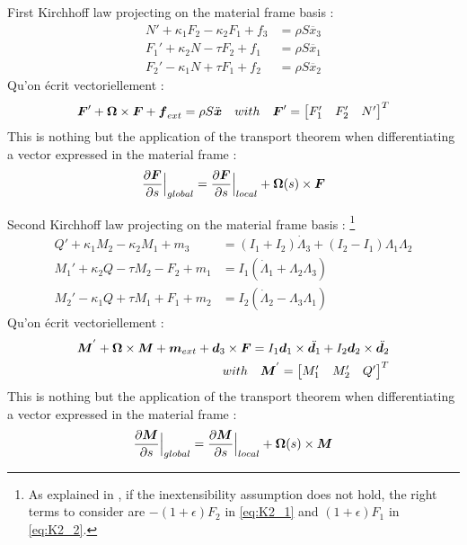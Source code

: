 First Kirchhoff law projecting on the material frame basis :
\begin{subequations}
	\begin{align}
		N' + \kappa_1 F_2 - \kappa_2 F_1 + f_3 &= \rho S \ddot{x_3}
		\label{eq:K1_3}\\
		F_1' + \kappa_2 N - \tau F_2 + f_1 &= \rho S \ddot{x_1}
		\label{eq:K1_1}\\
		F_2' - \kappa_1 N + \tau F_1 + f_2 &= \rho S \ddot{x_2}
		\label{eq:K1_2}
	\end{align}
\end{subequations}
Qu'on écrit vectoriellement : 
\begin{equation}
	\boldsymbol{F}' + \boldsymbol{\Omega} \times \boldsymbol{F} + \boldsymbol{f}_{ext} = \rho S \ddot{\boldsymbol{x}} 
	\quad with \quad
	\boldsymbol{F}' = 
	\begin{bmatrix}F'_1 & F'_2 & N'\end{bmatrix}^T
\end{equation}
This is nothing but the application of the transport theorem when differentiating a vector expressed in the material frame : 
\begin{equation}
	\frac{\partial \boldsymbol{F}}{\partial s}\Bigr|_{global} = \frac{\partial \boldsymbol{F}}{\partial s}\Bigr|_{local} + \boldsymbol{\Omega}(s) \times \boldsymbol{F}
\end{equation}

Second Kirchhoff law projecting on the material frame basis : \footnote{As explained in \cite[p. 18]{Dill1992}, if the inextensibility assumption does not hold, the right terms to consider are $-(1+\epsilon)F_2$ in \cref{eq:K2_1} and $(1+\epsilon)F_1$ in \cref{eq:K2_2}.}
\begin{subequations}
	\begin{align}
		Q' + \kappa_1 M_2 - \kappa_2 M_1 + m_3 &= (I_1 + I_2)\dot{\Lambda}_3 + (I_2 - I_1)\Lambda_1\Lambda_2
		\label{eq:K2_2}\\
		M_1' + \kappa_2 Q - \tau M_2 - F_2 + m_1 &= I_1 (\dot{\Lambda}_1 + \Lambda_2 \Lambda_3)
		\label{eq:K2_1}\\
		M_2' - \kappa_1 Q + \tau M_1 + F_1 + m_2 &= I_2 (\dot{\Lambda}_2 - \Lambda_3 \Lambda_1)
		\label{eq:K2_2}
	\end{align}
\end{subequations}
Qu'on écrit vectoriellement : 
\begin{align}
	\boldsymbol{M}^{'} + \boldsymbol{\Omega} \times \boldsymbol{M} + \boldsymbol{m}_{ext} + \boldsymbol{d}_3 \times \boldsymbol{F} = I_1 \boldsymbol{d}_1 \times \ddot{\boldsymbol{d}_1} + I_2 \boldsymbol{d}_2 \times \ddot{\boldsymbol{d}_2} \\
	\quad with \quad
	\boldsymbol{M}^{'} = 
	\begin{bmatrix}M'_1 & M'_2 & Q'\end{bmatrix}^T
\end{align}
This is nothing but the application of the transport theorem when differentiating a vector expressed in the material frame : 
\begin{equation}
	\frac{\partial \boldsymbol{M}}{\partial s}\Bigr|_{global} = \frac{\partial \boldsymbol{M}}{\partial s}\Bigr|_{local} + \boldsymbol{\Omega}(s) \times \boldsymbol{M}
\end{equation}


